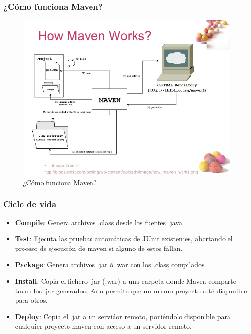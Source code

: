 \documentclass{beamer}
\begin{document}
\begin{frame}[fragile]
  \frametitle{¿Cómo funciona Maven?}
  \begin{figure}[ht]
    \centering
    \includegraphics[scale=0.4]{figures/how-maven-works.jpg}
    \caption{\label{fig:maven} ¿Cómo funciona Maven?}
  \end{figure}

\end{frame}

\begin{frame}
  \frametitle{Ciclo de vida}
  \begin{itemize}[<+->]
    \item \textbf{Compile}: Genera archivos .class desde los fuentes .java
    \item \textbf{Test}: Ejecuta las pruebas automáticas de JUnit existentes, abortando el
          proceso de ejecución de maven si alguno de estos fallan.
    \item \textbf{Package}: Genera archivos .jar ó .war con los .class compilados.
    \item \textbf{Install}: Copia el fichero .jar (.war) a una carpeta donde Maven comparte
          todos los .jar generados. Esto permite que un mismo proyecto esté
          disponible para otros.
    \item \textbf{Deploy}: Copia el .jar a un servidor remoto, poniéndolo disponible para
          cualquier proyecto maven con acceso a un servidor remoto.

   \end{itemize}

 \end{frame}
\end{document}
